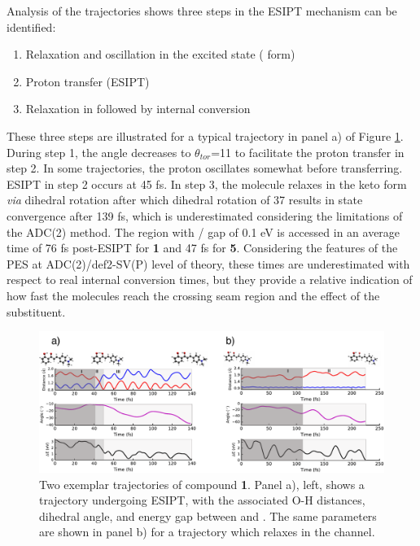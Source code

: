Analysis of the trajectories shows three steps in the ESIPT mechanism can be identified:
\begin{enumerate}
    \item Relaxation and oscillation in the excited state (\Estar{} form)
    \item Proton transfer (ESIPT) 
    \item Relaxation in \Kstar{} followed by internal conversion
\end{enumerate}

These three steps are illustrated for a typical trajectory in panel a) of Figure \ref{figure: HC_1_Trajectories}. During step 1, the angle decreases to $\theta_{tor}$=11\textdegree{} to facilitate the proton transfer in step 2. In some trajectories, the proton oscillates somewhat before transferring. ESIPT in step 2 occurs at 45 fs. In step 3, the molecule relaxes in the keto form \textit{via} dihedral rotation after which dihedral rotation of 37\textdegree{} results in state convergence after 139 fs, which is underestimated considering the limitations of the ADC(2) method. The region with \sone/\szero{} gap of 0.1 eV is accessed in an average time of 76 fs post-ESIPT for \textbf{1} and 47 fs for \textbf{5}. Considering the features of the PES at ADC(2)/def2-SV(P) level of theory, these times are underestimated with respect to real internal conversion times, but they provide a relative indication of how fast the molecules reach the crossing seam region and the effect of the substituent.
\begin{figure}[t]
\centering
  \includegraphics[width=0.9\linewidth]{3nonradiativedecay/HC_1_Trajectories.pdf}
  \caption[Typical trajectories for \textbf{HC1}]{Two exemplar trajectories of compound \textbf{1}. Panel a), left, shows a trajectory undergoing ESIPT, with the associated O-H distances, dihedral angle, and energy gap between \sone{} and \szero{}. The same parameters are shown in panel b) for a trajectory which relaxes in the \Estar{} channel.}
  \label{figure: HC_1_Trajectories}
\end{figure}

